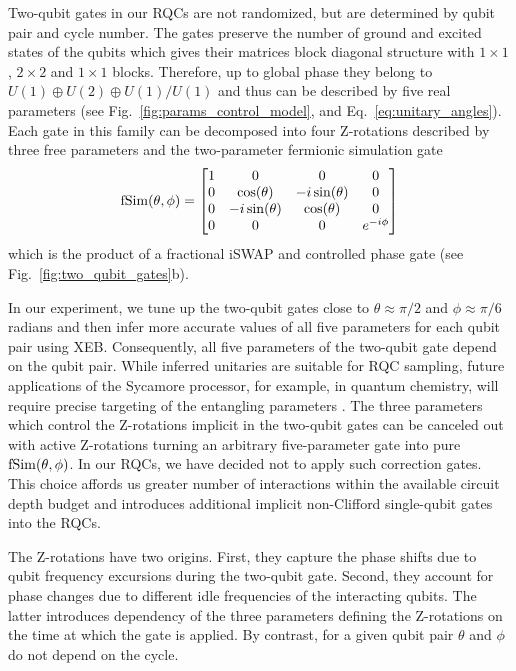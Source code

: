 Two-qubit gates in our RQCs are not randomized, but are determined by qubit pair and cycle number. The gates preserve the number of ground and excited states of the qubits which gives their matrices block diagonal structure with $1 \times 1$, $2 \times 2$ and $1 \times 1$ blocks. Therefore, up to global phase they belong to $U(1) \oplus U(2) \oplus U(1) / U(1)$ and thus can be described by five real parameters (see Fig.~\ref{fig:params_control_model}, and Eq.~\ref{eq:unitary_angles}). Each gate in this family can be decomposed into four Z-rotations described by three free parameters and the two-parameter fermionic simulation gate
\begin{equation} \label{eq:fsim}
{\rm fSim}(\theta, \phi) = \begin{bmatrix}
1 &             0  &              0 & 0 \\
0 &   \cos(\theta) & -i \sin(\theta) & 0 \\
0 & -i \sin(\theta) &   \cos(\theta) & 0 \\
0 &             0  &              0 & e^{-i \phi}
\end{bmatrix}
\end{equation}
which is the product of a fractional iSWAP and controlled phase gate (see Fig.~\ref{fig:two_qubit_gates}b).

In our experiment, we tune up the two-qubit gates close to $\theta \approx \pi/2$ and $\phi \approx \pi/6$ radians and then infer more accurate values of all five parameters for each qubit pair using XEB. Consequently, all five parameters of the two-qubit gate depend on the qubit pair. While inferred unitaries are suitable for RQC sampling, future applications of the Sycamore processor, for example, in quantum chemistry, will require precise targeting of the entangling parameters \cite{kivlichan2018quantum, babbush2018low}. The three parameters which control the Z-rotations implicit in the two-qubit gates can be canceled out with active Z-rotations turning an arbitrary five-parameter gate into pure $\rm{fSim} (\theta, \phi)$. In our RQCs, we have decided not to apply such correction gates. This choice affords us greater number of interactions within the available circuit depth budget and introduces additional implicit non-Clifford single-qubit gates into the RQCs.

The Z-rotations have two origins. First, they capture the phase shifts due to qubit frequency excursions during the two-qubit gate. Second, they account for phase changes due to different idle frequencies of the interacting qubits. The latter introduces dependency of the three parameters defining the Z-rotations on the time at which the gate is applied. By contrast, for a given qubit pair $\theta$ and $\phi$ do not depend on the cycle.

